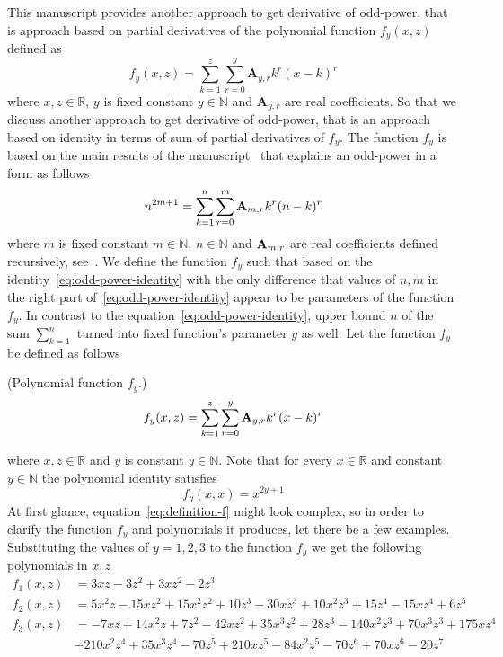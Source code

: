 This manuscript provides another approach to get derivative of odd-power, that is approach based on partial derivatives
of the polynomial function $f_y(x,z)$ defined as
\[
    f_{y} (x, z) = \sum_{k=1}^{z} \sum_{r=0}^{y} \mathbf{A}_{y,r} k^r (x-k)^r
\]
where $x, z\in \mathbb{R}$, $y$ is fixed constant $y \in \mathbb{N}$ and $\mathbf{A}_{y,r}$ are real coefficients.
So that we discuss another approach to get derivative of odd-power, that is an approach based
on identity in terms of sum of partial derivatives of $f_{y}$.
The function $f_{y}$ is based on the main results of the manuscript~\cite{kolosov_2022}
that explains an odd-power in a form as follows
\begin{equation}
    n^{2m+1} = \sum_{k=1}^{n} \sum_{r=0}^{m} {\mathbf{A}} \sb{m,r} k^r (n-k)^r
    \label{eq:odd-power-identity}
\end{equation}
where $m$ is fixed constant $m\in\mathbb{N}$, $n \in \mathbb{N}$ and ${\mathbf{A}} \sb{m,r}$ are real coefficients defined
recursively, see~\cite{kolosov2016link}.
We define the function $f_{y}$ such that based on the identity~\eqref{eq:odd-power-identity}
with the only difference that values of $n, m$ in the right part of~\eqref{eq:odd-power-identity}
appear to be parameters of the function $f_{y}$.
In contrast to the equation~\eqref{eq:odd-power-identity}, upper bound $n$ of the sum $\sum_{k=1}^{n}$ turned into fixed
function's parameter $y$ as well.
Let the function $f_{y}$ be defined as follows
\begin{definition} (Polynomial function $f_{y}$.)
    \begin{equation}
        f_{y} (x, z) = \sum_{k=1}^{z} \sum_{r=0}^{y} {\mathbf{A}} \sb{y,r} k^r (x-k)^r
        \label{eq:definition-f}
    \end{equation}
\end{definition}
where $x, z\in \mathbb{R}$ and $y$ is constant $y \in \mathbb{N}$.
Note that for every $x\in\mathbb{R}$ and constant $y\in\mathbb{N}$ the polynomial identity satisfies
\begin{equation*}
    f_{y} (x, x) = x^{2y+1}
\end{equation*}
At first glance, equation~\eqref{eq:definition-f} might look complex, so in order to clarify
the function $f_y$ and polynomials it produces, let there be a few examples.
Substituting the values of $y=1,2,3$ to the function $f_y$ we get the following polynomials in $x, z$
\begin{align*}
    f_{1} (x, z) &= 3 x z - 3 z^2 + 3 x z^2 - 2 z^3 \\
    f_{2} (x, z) &= 5 x^2 z - 15 x z^2 + 15 x^2 z^2 + 10 z^3 - 30 x z^3 + 10 x^2 z^3 +
    15 z^4 - 15 x z^4 + 6 z^5 \\
    f_{3} (x, z) &= -7 x z + 14 x^2 z + 7 z^2 - 42 x z^2 + 35 x^3 z^2 + 28 z^3 - 140 x^2 z^3 + 70 x^3 z^3 + 175 x z^4 \\
    &- 210 x^2 z^4 + 35 x^3 z^4 - 70 z^5 + 210 x z^5 - 84 x^2 z^5 - 70 z^6 + 70 x z^6 - 20 z^7
\end{align*}
